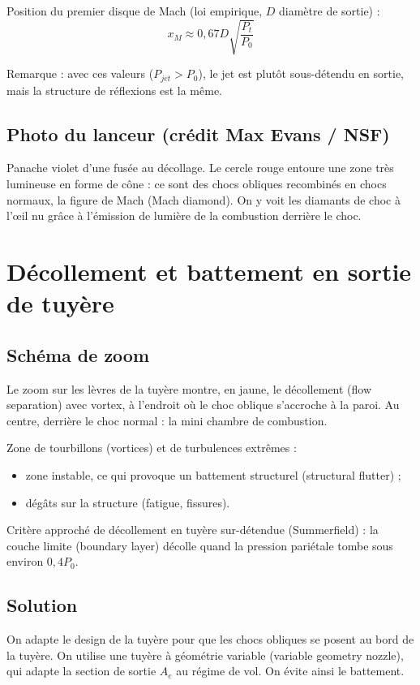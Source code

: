 \documentclass{article}
\begin{document}
Position du premier disque de Mach (loi empirique, $D$ diamètre de sortie) :
\[ x_M \approx 0,67 D \sqrt{\frac{P_t}{P_0}} \]

Remarque : avec ces valeurs ($P_{jet} > P_0$), le jet est plutôt sous-détendu en sortie, mais la structure de réflexions est la même.

\subsection{Photo du lanceur (crédit Max Evans / NSF)}
Panache violet d'une fusée au décollage. Le cercle rouge entoure une zone très lumineuse en forme de cône : ce sont des chocs obliques recombinés en chocs normaux, la figure de Mach (Mach diamond). On y voit les diamants de choc à l'œil nu grâce à l'émission de lumière de la combustion derrière le choc.

\section{Décollement et battement en sortie de tuyère}

\subsection{Schéma de zoom}
Le zoom sur les lèvres de la tuyère montre, en jaune, le décollement (flow separation) avec vortex, à l'endroit où le choc oblique s'accroche à la paroi. Au centre, derrière le choc normal : la mini chambre de combustion.

Zone de tourbillons (vortices) et de turbulences extrêmes :
\begin{itemize}
\item zone instable, ce qui provoque un battement structurel (structural flutter) ;
\item dégâts sur la structure (fatigue, fissures).
\end{itemize}

Critère approché de décollement en tuyère sur-détendue (Summerfield) : la couche limite (boundary layer) décolle quand la pression pariétale tombe sous environ $0,4 P_0$.

\subsection{Solution}
On adapte le design de la tuyère pour que les chocs obliques se posent au bord de la tuyère. On utilise une tuyère à géométrie variable (variable geometry nozzle), qui adapte la section de sortie $A_e$ au régime de vol. On évite ainsi le battement.
\end{document}
